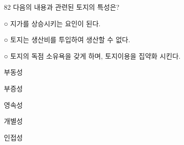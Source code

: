 \begin{question}{82}
다음의 내용과 관련된 토지의 특성은?
\begin{framedtext}
○ 지가를 상승시키는 요인이 된다. \par
○ 토지는 생산비를 투입하여 생산할 수 없다. \par
○ 토지의 독점 소유욕을 갖게 하며, 토지이용을 집약화 시킨다. \par
\end{framedtext}
\begin{choices}
  \item 부동성
  \item 부증성
  \item 영속성
  \item 개별성
  \item 인접성
\end{choices}
\end{question}
